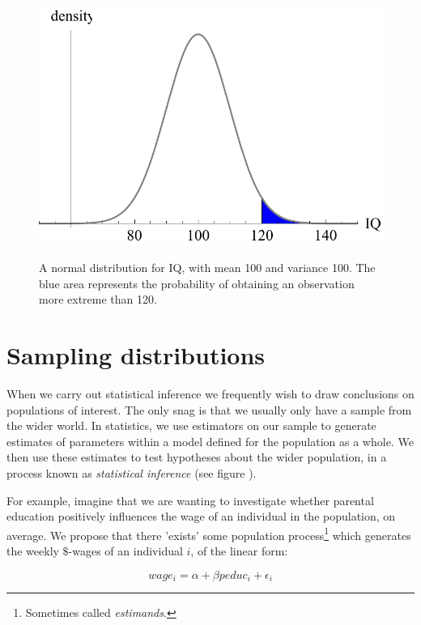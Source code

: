 \documentclass[11pt,fullpage]{book}
\begin{document}
\begin{figure}
\centering
\scalebox{0.6} 
{\includegraphics{Estimators_normalIQArea.pdf}}
\caption{A normal distribution for IQ, with mean 100 and variance 100. The blue area represents the probability of obtaining an observation more extreme than 120.}\label{fig:Estimators_normalIQArea}
\end{figure}

\section{Sampling distributions}
When we carry out statistical inference we frequently wish to draw conclusions on populations of interest. The only snag is that we usually only have a sample from the wider world. In statistics, we use estimators on our sample to generate estimates of parameters within a model defined for the population as a whole. We then use these estimates to test hypotheses about the wider population, in a process known as \textit{statistical inference} (see figure ). 

For example, imagine that we are wanting to investigate whether parental education positively influences the wage of an individual in the population, on average. We propose that there 'exists' some population process\footnote{Sometimes called \textit{estimands}.} which generates the weekly $\$$-wages of an individual $i$, of the linear form:

\begin{equation}\label{eq:Estimators_wageParentalEducationEstimand}
wage_i = \alpha + \beta peduc_i + \epsilon_i
\end{equation}
\end{document}
